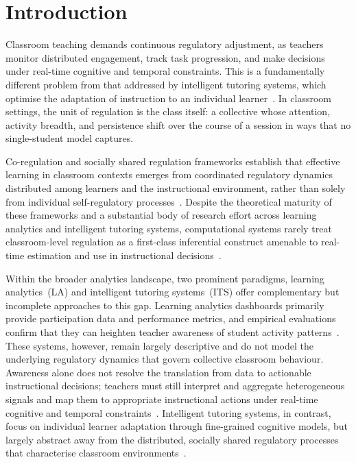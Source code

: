 \documentclass[preprint,12pt,authoryear]{elsarticle}
\begin{document}
\section{Introduction}

Classroom teaching demands continuous regulatory adjustment, as teachers monitor distributed engagement, track task progression, and make decisions under real-time cognitive and temporal constraints. This is a fundamentally different problem from that addressed by intelligent tutoring systems, which optimise the adaptation of instruction to an individual learner~\citep{olsen2021, feng2023}. In classroom settings, the unit of regulation is the class itself: a collective whose attention, activity breadth, and persistence shift over the course of a session in ways that no single-student model captures.

Co-regulation and socially shared regulation frameworks establish that effective learning in classroom contexts emerges from coordinated regulatory dynamics distributed among learners and the instructional environment, rather than solely from individual self-regulatory processes~\citep{hadwin2018, jarvela2021, malmberg2017}. Despite the theoretical maturity of these frameworks and a substantial body of research effort across learning analytics and intelligent tutoring systems, computational systems rarely treat classroom-level regulation as a first-class inferential construct amenable to real-time estimation and use in instructional decisions~\citep{holstein2019, olsen2021}.

Within the broader analytics landscape, two prominent paradigms, learning analytics~(LA) and intelligent tutoring systems~(ITS) offer complementary but incomplete approaches to this gap. Learning analytics dashboards primarily provide participation data and performance metrics, and empirical evaluations confirm that they can heighten teacher awareness of student activity patterns~\citep{han2021, wise2019, vanleeuwen2019}. These systems, however, remain largely descriptive and do not model the underlying regulatory dynamics that govern collective classroom behaviour. Awareness alone does not resolve the translation from data to actionable instructional decisions; teachers must still interpret and aggregate heterogeneous signals and map them to appropriate instructional actions under real-time cognitive and temporal constraints~\citep{molenaar2019, herodotou2021, molenaar2023}. Intelligent tutoring systems, in contrast, focus on individual learner adaptation through fine-grained cognitive models, but largely abstract away from the distributed, socially shared regulatory processes that characterise classroom environments~\citep{olsen2021}.
\end{document}
